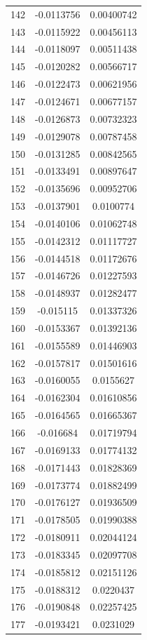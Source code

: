 \documentclass[a4paper, 11pt, oneside]{report}
\begin{document}
{\begin{longtable}{|c|c|c|}
142 & -0.0113756 & 0.00400742 \\
143 & -0.0115922 & 0.00456113 \\
144 & -0.0118097 & 0.00511438 \\
145 & -0.0120282 & 0.00566717 \\
146 & -0.0122473 & 0.00621956 \\
147 & -0.0124671 & 0.00677157 \\
148 & -0.0126873 & 0.00732323 \\
149 & -0.0129078 & 0.00787458 \\
150 & -0.0131285 & 0.00842565 \\
151 & -0.0133491 & 0.00897647 \\
152 & -0.0135696 & 0.00952706 \\
153 & -0.0137901 & 0.0100774  \\
154 & -0.0140106 & 0.01062748 \\
155 & -0.0142312 & 0.01117727 \\
156 & -0.0144518 & 0.01172676 \\
157 & -0.0146726 & 0.01227593 \\
158 & -0.0148937 & 0.01282477 \\
159 & -0.015115  & 0.01337326 \\
160 & -0.0153367 & 0.01392136 \\
161 & -0.0155589 & 0.01446903 \\
162 & -0.0157817 & 0.01501616 \\
163 & -0.0160055 & 0.0155627  \\
164 & -0.0162304 & 0.01610856 \\
165 & -0.0164565 & 0.01665367 \\
166 & -0.016684  & 0.01719794 \\
167 & -0.0169133 & 0.01774132 \\
168 & -0.0171443 & 0.01828369 \\
169 & -0.0173774 & 0.01882499 \\
170 & -0.0176127 & 0.01936509 \\
171 & -0.0178505 & 0.01990388 \\
172 & -0.0180911 & 0.02044124 \\
173 & -0.0183345 & 0.02097708 \\
174 & -0.0185812 & 0.02151126 \\
175 & -0.0188312 & 0.0220437  \\
176 & -0.0190848 & 0.02257425 \\
177 & -0.0193421 & 0.0231029  \\

\end{longtable}}
\end{document}
